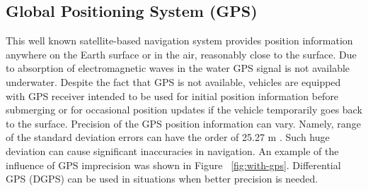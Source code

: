 \subsection{Global Positioning System (GPS)}
This well known satellite-based navigation system provides position information anywhere on the Earth surface or in the air, reasonably close to the surface. Due to absorption of electromagnetic waves in the water GPS signal is not available underwater. Despite the fact that GPS is not available, vehicles are equipped with GPS receiver intended to be used for initial position information before submerging or for occasional position updates if the vehicle temporarily goes back to the surface. Precision of the GPS position information can vary. Namely, range of the standard deviation errors can have the order of 25.27 m \cite{farrell98}. Such huge deviation can cause significant inaccuracies in navigation. An example of the influence of GPS imprecision was shown in Figure ~\ref{fig:with-gps}. Differential GPS (DGPS) \cite{farrell98} can be used in situations when better precision is needed.
